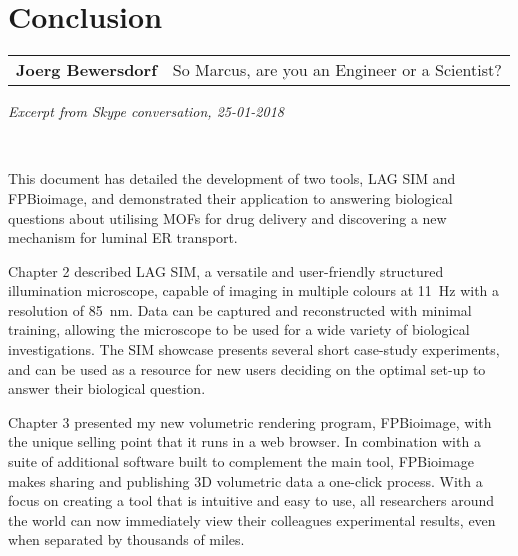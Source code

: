 \chapter{Conclusion}
\label{chap:conclusion}


\ifpdf
    \graphicspath{{Chapter6/Figs/Raster/}{Chapter6/Figs/PDF/}{Chapter6/Figs/}}
\else
    \graphicspath{{Chapter6/Figs/Vector/}{Chapter6/Figs/}}
\fi

\begin{tabular}{l l}
\textbf{Joerg Bewersdorf} & So Marcus, are you an Engineer or a Scientist? \\
\end{tabular}

\textit{Excerpt from Skype conversation, 25-01-2018}

~\newline

This document has detailed the development of two tools, LAG SIM and FPBioimage, and demonstrated their application to answering biological questions about utilising MOFs for drug delivery and discovering a new mechanism for luminal ER transport. 

Chapter 2 described LAG SIM, a versatile and user-friendly structured illumination microscope, capable of imaging in multiple colours at \SI{11}{\hertz} with a resolution of \SI{85}{\nano\metre}. 
Data can be captured and reconstructed with minimal training, allowing the microscope to be used for a wide variety of biological investigations. 
The SIM showcase presents several short case-study experiments, and can be used as a resource for new users deciding on the optimal set-up to answer their biological question. 

Chapter 3 presented my new volumetric rendering program, FPBioimage, with the unique selling point that it runs in a web browser.
In combination with a suite of additional software built to complement the main tool, FPBioimage makes sharing and publishing 3D volumetric data a one-click process.  
With a focus on creating a tool that is intuitive and easy to use, all researchers around the world can now immediately view their colleagues experimental results, even when separated by thousands of miles. 

